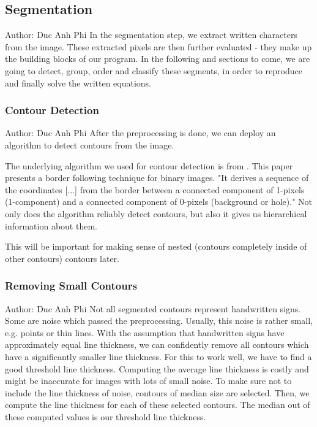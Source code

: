 \documentclass[12pt]{article}
\begin{document}
	
	
	
	\subsection{Segmentation}
		\small{Author: Duc Anh Phi} \newline \newline
	In the segmentation step, we extract written characters from the image.
	These extracted pixels are then further evaluated - they make up the building blocks of our program.
	In the following and sections to come, we are going to detect, group, order and classify these segments, in order to
	reproduce and finally solve the written equations.
	
	\subsubsection{Contour Detection}
	\small{Author: Duc Anh Phi} \newline \newline
	After the preprocessing is done, we can deploy an algorithm to detect contours from the image.
	
	The underlying algorithm we used for contour detection is from \cite{suzuki1985}.
	This paper presents a border following technique for binary images. "It derives a sequence of the coordinates [...]
	from the border between a connected component of 1-pixels (1-component) and a connected component of 0-pixels (background or hole)."
	Not only does the algorithm reliably detect contours, but also it gives us hierarchical information about them.
	
	This will be important for making sense of nested (contours completely inside of other contours) contours later.
	
	\subsubsection{Removing Small Contours}
	\small{Author: Duc Anh Phi} \newline \newline
	Not all segmented contours represent handwritten signs.
	Some are noise which passed the preprocessing. Usually, this noise is rather small, e.g. points or thin lines.
	With the assumption that handwritten signs have approximately equal line thickness, we can confidently remove all contours which have a significantly smaller line thickness.
	For this to work well, we have to find a good threshold line thickness.
	Computing the average line thickness is costly and might be inaccurate for images with lots of small noise.
	To make sure not to include the line thickness of noise, contours of median size are selected. Then, we compute the line thickness for each of these selected contours.
	The median out of these computed values is our threshold line thickness.
	
\end{document}
